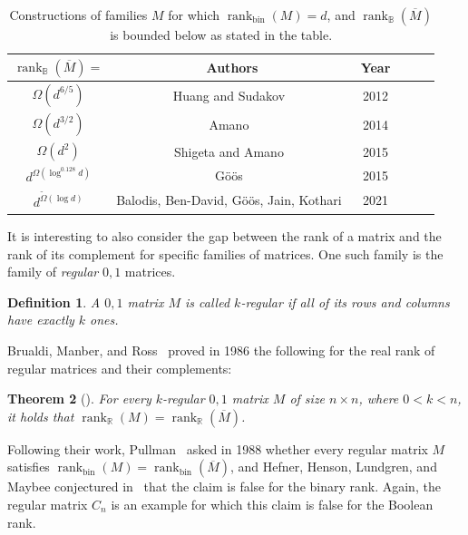 \documentclass[11pt]{article}
\newtheorem{theorem}{Theorem}
\newtheorem{definition}[theorem]{Definition}
\newcommand{\rank}{\mathop{\mathrm{rank}}}
\newcommand{\Rbool}{{\rank}_\mathbb{B}}
\newcommand{\Rbin}{{\rank}_{\mathrm{bin}}}
\newcommand{\Rreal}{{\rank}_\mathbb{R}}
\begin{document}
{{  \begin{table}[ht]
    \centering
    \begin{tabular}{|Sc|Sc|Sc|}
    \hline
        $\Rbool(\overline{M}) = $ & Authors & Year \\ [6pt]
        \hline \hline
        $\Omega(d^{6/5})$ & Huang and Sudakov~\cite{HuangS12} & 2012  \\ [6pt] \hline
        $\Omega(d^{3/2})$ & Amano~\cite{Amano14} & 2014  \\ [6pt] \hline
        $\Omega(d^{2})$ & Shigeta and Amano~\cite{ShigetaA15} & 2015 \\ [6pt] \hline
        $d^{\Omega(\log^{0.128} d)}$ & G{\"{o}}{\"{o}}s~\cite{Goos15} & 2015 \\ [6pt] \hline
        $d^{\widetilde{\Omega}(\log d)}$ & Balodis, Ben-David, G{\"{o}}{\"{o}}s, Jain, Kothari~\cite{BBGJK21} & 2021 \\ [6pt] \hline
    \end{tabular}
    \caption{Constructions of families $M$ for which $\Rbin(M) = d$, and $\Rbool(\overline{M})$ is bounded below as stated in the table.}
    \label{tab:lowerbounds}
\end{table}


It is interesting to also consider the gap between the rank of a matrix and the rank of its complement for specific families of matrices.
One such family is the family  of  {\em regular} $0,1$ matrices.

\begin{definition}
A $0,1$ matrix $M$ is called $k$-regular if all of its rows and columns have exactly $k$ ones.
\end{definition}

Brualdi, Manber, and Ross~\cite{BrualdiMR86} proved in 1986 the following for the real rank of regular matrices and their complements:

\begin{theorem}[\cite{BrualdiMR86}]
\label{theo-real-acomplement}
For every $k$-regular $0,1$ matrix $M$ of size $n \times n$, where $0 < k < n$,
it holds that $\Rreal(M) = \Rreal(\overline{M})$.
\end{theorem}

Following their work, Pullman~\cite{Pullman88} asked in 1988 whether every regular matrix $M$ satisfies $\Rbin(M) = \Rbin(\overline{M})$,
and Hefner,  Henson,  Lundgren, and  Maybee  conjectured in~\cite{HefnerHLM90} that the claim is false for the binary rank.
Again, the regular matrix $C_n$ is an example for which this claim is false for the Boolean rank.

}}
\end{document}
